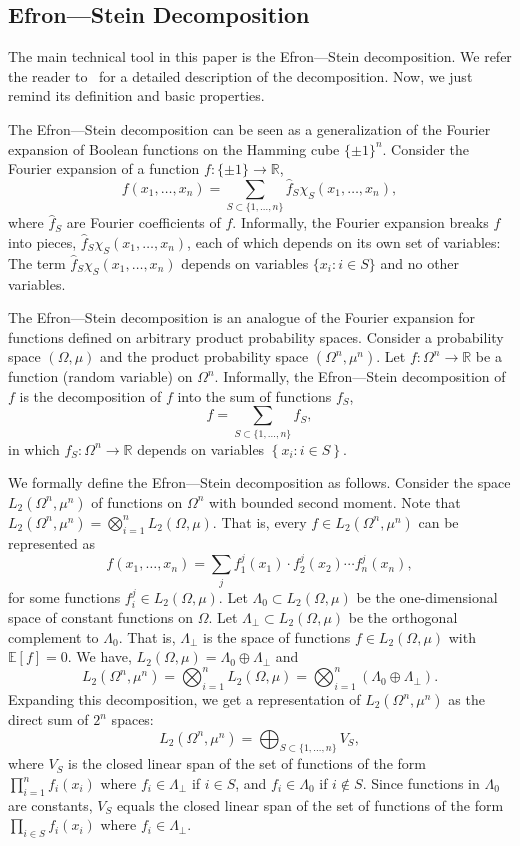\documentclass[11pt]{article}
\newcommand {\set}   [1] {\left\{ #1 \right\}}
\newcommand {\Exp}       {\mathbb{E}}
\newcommand {\E}     [1] {\Exp\left[#1\right]}
\begin{document}
\subsection{Efron---Stein Decomposition}\label{sec:EfronStein}
The main technical tool in this paper is the Efron---Stein decomposition. We refer the reader to~\cite[Section 8.3]{ODonnell} for
a detailed description of the decomposition. Now, we just remind its definition and basic properties.

The Efron---Stein decomposition can be seen as a generalization of the Fourier expansion
of Boolean functions on the Hamming cube $\{\pm 1\}^n$. Consider the Fourier expansion of a function
$f:\{\pm 1\} \to \mathbb R$,
$$f(x_1,\dots,x_n) = \sum_{S\subset \{1,\dots, n\}} \hat f_S \chi_S(x_1,\dots, x_n),$$
where $\hat f_S$ are Fourier coefficients of $f$. Informally,
the Fourier expansion  breaks $f$ into pieces, $\hat f_S \chi_S(x_1,\dots, x_n)$, each of which depends on its own set of variables: The term
$\hat f_S \chi_S(x_1,\dots, x_n)$ depends on variables $\{x_i:i \in S\}$ and no other variables.

The Efron---Stein decomposition is an analogue of the Fourier expansion for functions defined on arbitrary product probability spaces. Consider a probability space $(\Omega,\mu)$ and the product probability space $(\Omega^n,\mu^n)$.
Let $f:\Omega^n\to \mathbb R$ be a function (random variable) on $\Omega^n$. Informally, the Efron---Stein decomposition of $f$ is the decomposition of $f$ into the sum of
functions $f_S$,
$$f = \sum_{S\subset \{1,\dots, n\}} f_S,$$
in which $f_S:\Omega^n\to \mathbb R$ depends on variables $\set{x_i :i\in S}$.

We formally define the  Efron---Stein decomposition  as follows.
Consider the space $L_2(\Omega^n,\mu^n)$ of functions on $\Omega^n$ with bounded second moment. Note that $L_2(\Omega^n,\mu^n) = \bigotimes_{i=1}^n L_2(\Omega,\mu)$.
That is, every $f\in L_2(\Omega^n,\mu^n)$ can be represented as
$$f(x_1,\dots, x_n) = \sum_j f^j_1(x_1)\cdot f^j_2(x_2)\cdots  f^{j}_n(x_n),$$
for some functions $f^j_i\in L_2(\Omega,\mu)$. Let $\Lambda_0\subset L_2(\Omega,\mu)$ be the one-dimensional space of constant functions on $\Omega$. Let $\Lambda_{\perp} \subset  L_2(\Omega,\mu)$ be the orthogonal complement to $\Lambda_0$. That is, $\Lambda_{\perp}$ is the space of functions
$f\in L_2(\Omega,\mu)$ with $\E{f} = 0$. We have, $L_2(\Omega,\mu) = \Lambda_0 \oplus \Lambda_{\perp}$ and
$$L_2(\Omega^n,\mu^n) = \bigotimes_{i=1}^n L_2(\Omega,\mu) = \bigotimes_{i=1}^n (\Lambda_0 \oplus \Lambda_{\perp}).$$
Expanding this decomposition, we get a representation of $L_2(\Omega^n,\mu^n)$ as the direct sum of $2^n$ spaces:
$$L_2(\Omega^n,\mu^n)= \bigoplus_{S\subset \{1,\dots, n\}} V_S,$$
where $V_S$ is the closed linear span of the set of functions of the form $\prod_{i=1}^n f_i(x_i)$ where $f_i\in \Lambda_{\perp}$ if $i\in S$, and $f_i\in \Lambda_0$ if $i\notin S$.
Since functions in $\Lambda_0$ are constants, $V_S$ equals the closed linear span of the set of functions of the form $\prod_{i\in S} f_i(x_i)$ where
$f_i\in \Lambda_{\perp}$.
\end{document}
